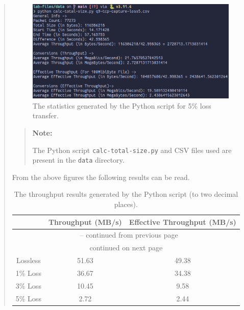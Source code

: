 \documentclass{article}
\newenvironment{ans}
{\fbox{Answer}\begin{quote}\nopagebreak}
{\end{quote}}
\newenvironment{note}{%
\begin{quote}
\begin{tcolorbox}[colback=gray!10,arc=0mm,boxrule=0pt]
\raggedright
\textbf{Note:}%
}{%
\end{tcolorbox}
\end{quote}%
}
\begin{document}
\begin{ans}
\begin{figure}[H]
\centering
\includegraphics[width=16cm]{data/q9-stats-tcp-loss5.png}
\caption{The statistics generated by the Python script for 5\% loss transfer.}
\end{figure}

\begin{note}
The Python script \texttt{calc-total-size.py} and CSV files used are present in the \texttt{data} directory.
\end{note}

From the above figures the following results can be read.

\begin{center}
\begin{longtable}{c|cc}
\caption{The throughput results generated by the Python script (to two decimal places).}
\label{longtable:results-q9}                                                                            \\
\multicolumn{1}{c|}{}                 &
\multicolumn{1}{c}{Throughput (MB/s)} &
\multicolumn{1}{c}{Effective Throughput (MB/s)}\\
\hline
\endfirsthead

\multicolumn{3}{c}{\tablename\ \thetable{} -- continued from previous page}                                     \\
\hline
\endhead

\hline
\multicolumn{3}{|c|}{{continued on next page}}                                                                  \\
\hline
\endfoot

\endlastfoot

Lossless & 51.63 & 49.38\\
1\% Loss & 36.67 & 34.38\\
3\% Loss & 10.45 & 9.58 \\
5\% Loss & 2.72  & 2.44
\end{longtable}
\end{center}


\end{ans}
\end{document}
